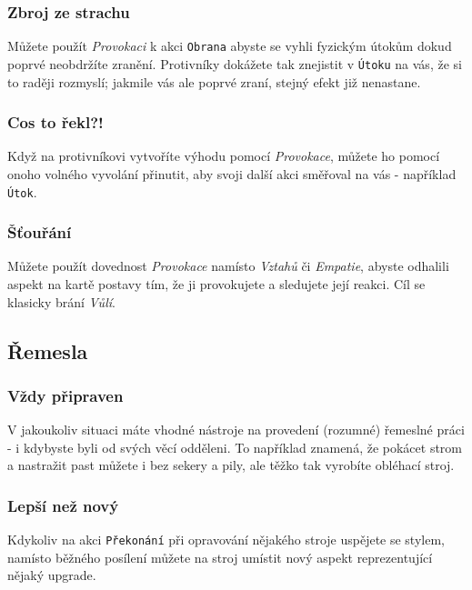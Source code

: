 \subsubsection{Zbroj ze strachu}
\label{sec:provokace-zbroj}

Můžete použít \textit{Provokaci} k akci \texttt{Obrana} abyste se vyhli fyzickým útokům dokud poprvé neobdržíte zranění. Protivníky dokážete tak znejistit v \texttt{Útoku} na vás, že si to raději rozmyslí; jakmile vás ale poprvé zraní, stejný efekt již nenastane.

\subsubsection{Cos to řekl?!}
\label{sec:provokace-cos}
Když na protivníkovi vytvoříte výhodu pomocí \textit{Provokace}, můžete ho pomocí onoho volného vyvolání přinutit, aby svoji další akci směřoval na vás - například \texttt{Útok}.

\subsubsection{Šťouřání}
\label{sec:provokace-stourani}

Můžete použít dovednost \textit{Provokace} namísto \textit{Vztahů} či \textit{Empatie}, abyste odhalili aspekt na kartě postavy tím, že ji provokujete a sledujete její reakci. Cíl se klasicky brání \textit{Vůlí}.

\subsection{Řemesla}
\label{sec:trik-remesla}

\subsubsection{Vždy připraven}
\label{sec:remesla-pripraven}

V jakoukoliv situaci máte vhodné nástroje na provedení (rozumné) řemeslné práci - i kdybyste byli od svých věcí odděleni. To například znamená, že pokácet strom a nastražit past můžete i bez sekery a pily, ale těžko tak vyrobíte obléhací stroj.

\subsubsection{Lepší než nový}
\label{sec:remesla-lepsi}

Kdykoliv na akci \texttt{Překonání} při opravování nějakého stroje uspějete se stylem, namísto běžného posílení můžete na stroj umístit nový aspekt reprezentující nějaký upgrade.

